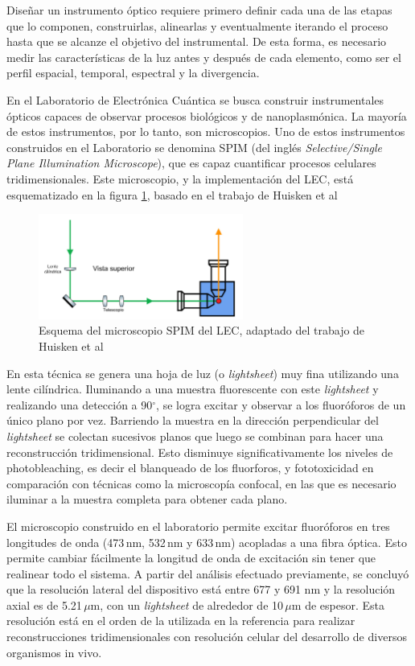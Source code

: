 Diseñar un instrumento óptico requiere primero definir cada una de las etapas que lo componen, construirlas, alinearlas y eventualmente iterando el proceso hasta que se alcanze el objetivo del instrumental. De esta forma, es necesario medir las características de la luz antes y después de cada elemento, como ser el perfil espacial, temporal, espectral y la divergencia. 

En el Laboratorio de Electrónica Cuántica se busca construir instrumentales ópticos capaces de observar procesos biológicos y de nanoplasmónica. La mayoría de estos instrumentos, por lo tanto, son microscopios. Uno de estos instrumentos construidos en el Laboratorio se denomina SPIM (del inglés \textit{Selective/Single Plane Illumination Microscope}), que es capaz cuantificar procesos celulares tridimensionales. Este microscopio, y la implementación del LEC, está esquematizado en la figura \ref{fig:spim_lec}, basado en el trabajo de Huisken et al\cite{huisken2004}

\begin{figure}[H]
    \centering
    \includegraphics[width=0.6\textwidth]{fig/spim_lec}
    \caption{Esquema del microscopio SPIM del LEC, adaptado del trabajo de Huisken et al \cite{huisken2004}}
    \label{fig:spim_lec}
\end{figure}
En esta técnica se genera una hoja de luz (o \textit{lightsheet}) muy fina utilizando una lente cilíndrica. Iluminando a una muestra fluorescente con este \textit{lightsheet} y realizando una detección a 90$^{\circ}$, se logra excitar y observar a los fluoróforos de un único plano por vez. Barriendo la muestra en la dirección perpendicular del \textit{lightsheet} se colectan sucesivos planos que luego se combinan para hacer una reconstrucción tridimensional. Esto disminuye significativamente los niveles de photobleaching, es decir el blanqueado de los fluorforos, y fototoxicidad en comparación con técnicas como la microscopía confocal, en las que es necesario iluminar a la muestra completa para obtener cada plano. 

El microscopio construido en el laboratorio permite excitar fluoróforos en tres longitudes de onda (473$\,$nm, 532$\,$nm y 633$\,$nm) acopladas a una fibra óptica. Esto permite cambiar fácilmente la longitud de onda de excitación sin tener que realinear todo el sistema. A partir del análisis efectuado previamente, se concluyó que la resolución lateral del dispositivo está entre 677 y 691 nm y la resolución axial es de 5.21$\,\mu$m, con un \textit{lightsheet} de alrededor de 10$\,\mu$m de espesor. Esta resolución está en el orden de la utilizada en la referencia\cite{huisken2004} para realizar reconstrucciones tridimensionales con resolución celular del desarrollo de diversos organismos in vivo.

